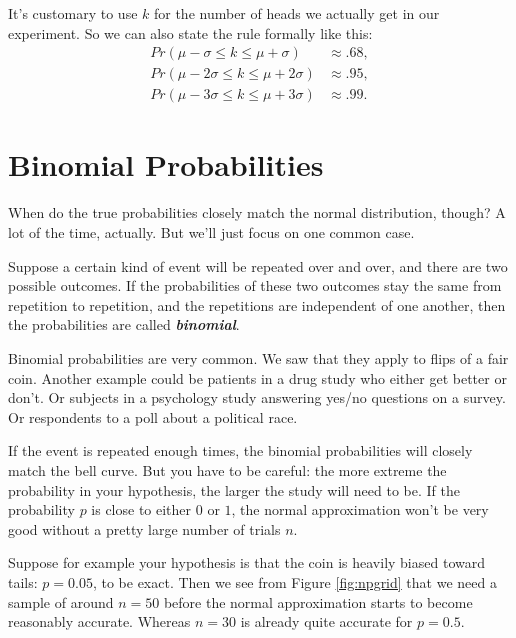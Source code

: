 \documentclass[justified]{tufte-book}
\newcommand{\p}{Pr}
\theoremstyle{definition}
\theoremstyle{definition}
\theoremstyle{definition}
\theoremstyle{definition}
\theoremstyle{remark}
\begin{document}
It's customary to use \(k\) for the number of heads we actually get in our experiment. So we can also state the rule formally like this:
\[
  \begin{aligned}
    \p(\mu - \sigma \leq k \leq \mu + \sigma) &\approx .68,\\
    \p(\mu - 2\sigma \leq k \leq \mu + 2\sigma) &\approx .95,\\
    \p(\mu - 3\sigma \leq k \leq \mu + 3\sigma) &\approx .99.
  \end{aligned}
\]

\hypertarget{binomial-probabilities}{%
\section{Binomial Probabilities}\label{binomial-probabilities}}

When do the true probabilities closely match the normal distribution, though? A lot of the time, actually. But we'll just focus on one common case.

Suppose a certain kind of event will be repeated over and over, and there are two possible outcomes. If the probabilities of these two outcomes stay the same from repetition to repetition, and the repetitions are independent of one another, then the probabilities are called \textbf{\emph{binomial}}.

Binomial probabilities are very common. We saw that they apply to flips of a fair coin. Another example could be patients in a drug study who either get better or don't. Or subjects in a psychology study answering yes/no questions on a survey. Or respondents to a poll about a political race.

If the event is repeated enough times, the binomial probabilities will closely match the bell curve. But you have to be careful: the more extreme the probability in your hypothesis, the larger the study will need to be. If the probability \(p\) is close to either \(0\) or \(1\), the normal approximation won't be very good without a pretty large number of trials \(n\).

Suppose for example your hypothesis is that the coin is heavily biased toward tails: \(p = 0.05\), to be exact. Then we see from Figure \ref{fig:npgrid} that we need a sample of around \(n = 50\) before the normal approximation starts to become reasonably accurate. Whereas \(n = 30\) is already quite accurate for \(p = 0.5\).
\end{document}
